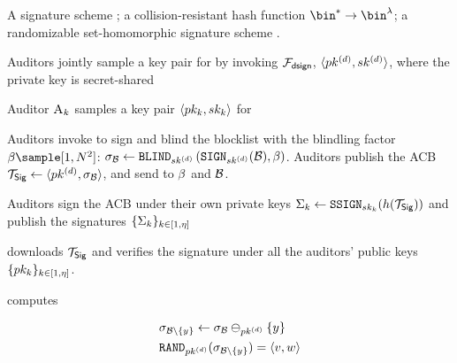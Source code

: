 \begin{algorithm}
\caption{\sigACB: Signature Based Blocklist}
\label{acb:sig}
\footnotesize
\begin{algorithmic}[1]

\Require A signature scheme \sigSchemeDefn; a collision-resistant hash function $\bin^{\ast} \rightarrow \bin^{\secParam}$; a randomizable set-homomorphic signature scheme \ourSigSchemeDefn. 

\Statex\Procedure{\publishList}{\blocklist}

\State Auditors jointly sample a key pair for  \ourSigScheme by invoking $\mathcal{F}_{\mathsf{dsign}}$, $\langle \auditorPubKeyOurScheme, \auditorPrivKeyOurScheme \rangle$, where the private key is secret-shared

\State Auditor $\auditor[\auditorIdx]$ samples a key pair $\langle \auditorPubKeyGenericScheme[\auditorIdx], \auditorPrivKeyGenericScheme[\auditorIdx] \rangle$ for \sigScheme 


\State Auditors invoke \distSigningFunc to sign and blind the blocklist with the blindling factor $\blindingFactor \sample [1,\rsaMod^2]$: $\genericSig[\blocklist] \assign \blind[\auditorPrivKeyOurScheme]\left(\signingAlg[\auditorPrivKeyOurScheme](\blocklist), \blindingFactor\right)$. Auditors publish the ACB $\sigBlklistToken \assign \langle \auditorPubKeyOurScheme, \genericSig[\blocklist] \rangle$, and send to \server $\beta$ and $\blocklist$. 


\State Auditors sign the ACB  under their own private keys $\auditorSig{\auditorIdx} \assign \signGenSig[\auditorPrivKeyGenericScheme[\auditorIdx]](\hashFn(\sigBlklistToken)) $ and publish the signatures $\{\Sigma_{k}\}_{k \in [1, \eta]}$


\State \client downloads $\sigBlklistToken$ and verifies the signature under all the auditors' public keys $\{\auditorPubKeyGenericScheme[\auditorIdx]\}_{\auditorIdx \in [1, \numAuditors]}$. 

\EndProcedure



\Statex\Procedure{\searchBlocklist}{\genericCInputElmt, \sigBlklistToken}
%

\State \client computes 

\begin{align*}
&\genericSig[\blocklist \setminus \{\genericCInputElmt\}] \assign \genericSig[\blocklist] \sigMinus[\auditorPubKeyOurScheme] \{ \genericCInputElmt \} \\
&\randomize[\auditorPubKeyOurScheme](\genericSig[\blocklist \setminus \{\genericCInputElmt \}]) = \langle \genericSigPair[1], \genericSigPair[2] \rangle
\end{align*}


\end{algorithmic}
\end{algorithm}
